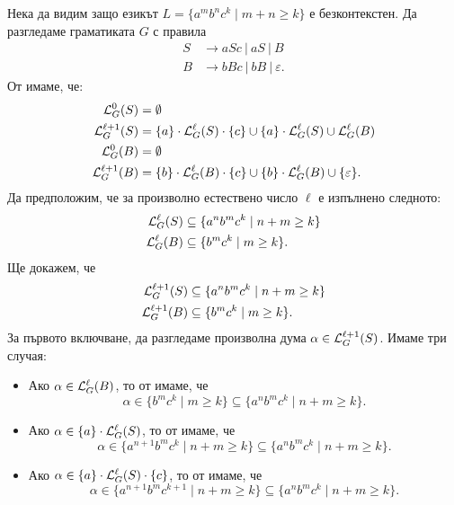 \begin{extra}
  
  \begin{example}
    Нека да видим защо езикът $L = \{a^mb^nc^k\mid m+n \geq k\}$ е безконтекстен.
    Да разгледаме граматиката $G$ с правила
    \begin{align*}
      S& \rightarrow aSc\ |\ aS\ |\ B\\
      B& \rightarrow bBc\ |\  bB\ |\ \varepsilon.
    \end{align*}
    От  имаме, че:
    \begin{align*}
      \mathcal{L}^0_G(S) & = \emptyset\\
      \mathcal{L}^{\ell+1}_G(S) & = \{a\} \cdot \mathcal{L}^\ell_G(S) \cdot \{c\} \cup \{a\}\cdot \mathcal{L}^\ell_G(S) \cup \mathcal{L}^\ell_G(B)\\
      \mathcal{L}^0_G(B) & = \emptyset\\
      \mathcal{L}^{\ell+1}_G(B) & = \{b\} \cdot \mathcal{L}^\ell_G(B) \cdot \{c\} \cup \{b\} \cdot \mathcal{L}^\ell_G(B) \cup \{\varepsilon\}.
    \end{align*}
    Да предположим, че за произволно естествено число $\ell$ е изпълнено следното:
    \begin{align}
      \mathcal{L}^\ell_G(S) & \subseteq \{a^nb^mc^k \mid n+m \geq k\} \\
      \mathcal{L}^\ell_G(B)  & \subseteq \{ b^mc^k \mid m \geq k\}. 
    \end{align}
    Ще докажем, че
    \begin{align*}
      \mathcal{L}^{\ell+1}_G(S) & \subseteq \{a^nb^mc^k \mid n+m \geq k\}\\
      \mathcal{L}^{\ell+1}_G(B)  & \subseteq \{ b^mc^k \mid m \geq k\}.
    \end{align*}
    За първото включване, да разгледаме произволна дума $\alpha \in \mathcal{L}^{\ell+1}_G(S)$. Имаме три случая:
    \begin{itemize}
    \item
      Ако $\alpha \in \mathcal{L}^\ell_G(B)$, то от \IndHyp имаме, че
      \[\alpha \in \{b^mc^k \mid m \geq k\} \subseteq \{a^nb^mc^k \mid n+m \geq k\}.\]
    \item
      Ако $\alpha \in \{a\} \cdot \mathcal{L}^{\ell}_G(S)$, то от \IndHyp имаме, че
      \[\alpha \in \{a^{n+1}b^mc^k \mid n+m \geq k\} \subseteq \{a^nb^mc^k \mid n+m \geq k\}.\]
    \item
      Ако $\alpha \in \{a\} \cdot \mathcal{L}^{\ell}_G(S) \cdot \{c\}$, то от \IndHyp имаме, че
      \[\alpha \in \{a^{n+1}b^mc^{k+1} \mid n+m \geq k\} \subseteq \{a^nb^mc^k \mid n+m \geq k\}.\]
    \end{itemize}
    

\end{example}
\end{extra}
